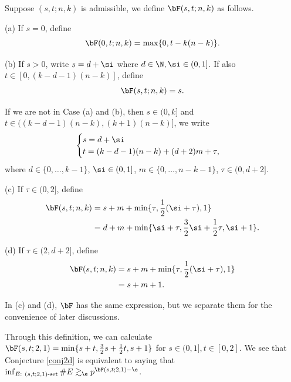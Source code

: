 \begin{definition}\label{deffurindex}
    Suppose $(s,t;n,k)$ is admissible, we define $\bF(s,t;n,k)$ as follows.
    
    (a) If $s=0$, define
    \begin{equation}
        \bF(0,t;n,k)= \max\{0,t-k(n-k)\}.
    \end{equation}

    (b) If $s>0$, write $s=d+\si$ where $d\in\N, \si\in(0,1]$. If also $t\in [0,(k-d-1)(n-k)]$, define
    \begin{equation}
        \bF(s,t;n,k)= s.
    \end{equation}


    If we are not in Case (a) and (b), then $s\in (0,k]$ and $t\in ((k-d-1)(n-k),(k+1)(n-k)]$,
    we write 
\begin{equation}\label{expression}
    \begin{cases}
        s=d+\si\\
        t=(k-d-1)(n-k)+(d+2)m+\tau,
    \end{cases}
\end{equation} 
    where $d\in\{0,\dots,k-1\}$, $\si\in (0,1]$,  $m\in\{0,\dots,n-k-1\}$, $\tau\in (0,d+2]$. 

(c) If $\tau\in(0,2]$, define
\begin{equation}
\begin{split}
    \bF(s,t;n,k)&=s+m+\min\{\tau,\frac12(\si+\tau),1\}\\
    &= d+m+\min\{\si+\tau,\frac32\si+\frac12\tau,\si+1\}.
\end{split}
\end{equation}

(d) If $\tau\in (2,d+2]$, define
\begin{equation}
\begin{split}
    \bF(s,t;n,k)&=s+m+\min\{\tau,\frac12(\si+\tau),1\}\\
    &= s+m+1.
\end{split}
\end{equation}
    
    
\end{definition}

\begin{remark}
    {\rm In (c) and (d), $\bF$ has the same expression, but we separate them for the convenience of later discussions.
    
    Through this definition, we can calculate $\bF(s,t;2,1)=\min\{s+t,\frac32s+\frac12t,s+1\}$ for $s\in (0,1], t\in [0,2]$. We see that Conjecture \ref{conj2d} is equivalent to saying that $\inf_{E:\ (s,t;2,1)\textup{-set}} \#E\gtrsim_\e p^{\bF(s,t;2,1)-\e}$. }
\end{remark}

